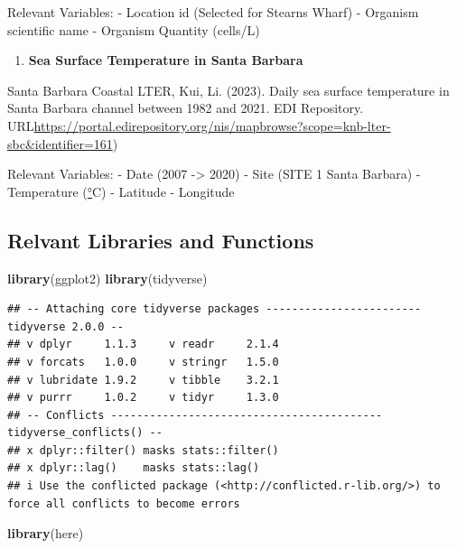 \documentclass[
]{article}
\newenvironment{Shaded}{\begin{snugshade}}{\end{snugshade}}
\newcommand{\FunctionTok}[1]{\textcolor[rgb]{0.13,0.29,0.53}{\textbf{#1}}}
\newcommand{\NormalTok}[1]{#1}
\providecommand{\tightlist}{%
  \setlength{\itemsep}{0pt}\setlength{\parskip}{0pt}}
\begin{document}
Relevant Variables: - Location id (Selected for Stearns Wharf) -
Organism scientific name - Organism Quantity (cells/L)

\begin{enumerate}
\def\labelenumi{\arabic{enumi}.}
\setcounter{enumi}{1}
\tightlist
\item
  \textbf{Sea Surface Temperature in Santa Barbara}
\end{enumerate}

Santa Barbara Coastal LTER, Kui, Li. (2023). Daily sea surface
temperature in Santa Barbara channel between 1982 and 2021. EDI
Repository.
URL\url{https://portal.edirepository.org/nis/mapbrowse?scope=knb-lter-sbc\&identifier=161})

Relevant Variables: - Date (2007 -\textgreater{} 2020) - Site (SITE 1
Santa Barbara) - Temperature (\href{https://www.degreesymbol.net/}{°}C)
- Latitude - Longitude

\hypertarget{relvant-libraries-and-functions}{%
\subsection{Relvant Libraries and
Functions}\label{relvant-libraries-and-functions}}

\begin{Shaded}
\begin{Highlighting}[]
\FunctionTok{library}\NormalTok{(ggplot2)}
\FunctionTok{library}\NormalTok{(tidyverse)}
\end{Highlighting}
\end{Shaded}

\begin{verbatim}
## -- Attaching core tidyverse packages ------------------------ tidyverse 2.0.0 --
## v dplyr     1.1.3     v readr     2.1.4
## v forcats   1.0.0     v stringr   1.5.0
## v lubridate 1.9.2     v tibble    3.2.1
## v purrr     1.0.2     v tidyr     1.3.0
## -- Conflicts ------------------------------------------ tidyverse_conflicts() --
## x dplyr::filter() masks stats::filter()
## x dplyr::lag()    masks stats::lag()
## i Use the conflicted package (<http://conflicted.r-lib.org/>) to force all conflicts to become errors
\end{verbatim}

\begin{Shaded}
\begin{Highlighting}[]
\FunctionTok{library}\NormalTok{(here)}
\end{Highlighting}
\end{Shaded}
\end{document}

